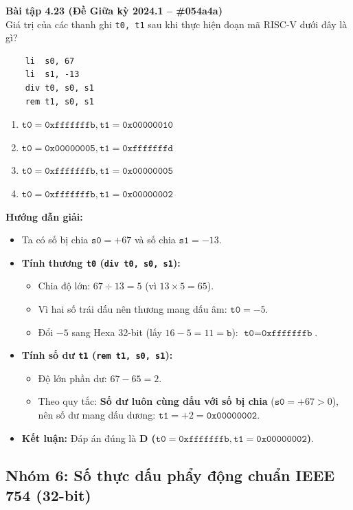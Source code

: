 \textbf{Bài tập 4.23 (Đề Giữa kỳ 2024.1 -- \#054a4a)}\\
Giá trị của các thanh ghi \texttt{t0, t1} sau khi thực hiện đoạn mã RISC-V dưới đây là gì?
\begin{lstlisting}
    li  s0, 67
    li  s1, -13
    div t0, s0, s1
    rem t1, s0, s1
\end{lstlisting}
\begin{enumerate}[label=\Alph*.]
    \item $\texttt{t0} = \texttt{0xfffffffb}, \texttt{t1} = \texttt{0x00000010}$
    \item $\texttt{t0} = \texttt{0x00000005}, \texttt{t1} = \texttt{0xfffffffd}$
    \item $\texttt{t0} = \texttt{0xfffffffb}, \texttt{t1} = \texttt{0x00000005}$
    \item $\texttt{t0} = \texttt{0xfffffffb}, \texttt{t1} = \texttt{0x00000002}$
\end{enumerate}
\textbf{Hướng dẫn giải:}
\begin{itemize}
    \item Ta có số bị chia $\texttt{s0} = +67$ và số chia $\texttt{s1} = -13$.
    \item \textbf{Tính thương \texttt{t0} (\texttt{div t0, s0, s1}):}
    \begin{itemize}
        \item Chia độ lớn: $67 \div 13 = 5$ (vì $13 \times 5 = 65$).
        \item Vì hai số trái dấu nên thương mang dấu âm: $\texttt{t0} = -5$.
        \item Đổi $-5$ sang Hexa 32-bit (lấy $16 - 5 = 11 = \texttt{b}$): $\texttt{t0} = \mathbf{\texttt{0xfffffffb}}$.
    \end{itemize}
    \item \textbf{Tính số dư \texttt{t1} (\texttt{rem t1, s0, s1}):}
    \begin{itemize}
        \item Độ lớn phần dư: $67 - 65 = 2$.
        \item Theo quy tắc: \textbf{Số dư luôn cùng dấu với số bị chia} ($\texttt{s0} = +67 > 0$), nên số dư mang dấu dương: $\texttt{t1} = +2 = \mathbf{\texttt{0x00000002}}$.
    \end{itemize}
    \item \textbf{Kết luận:} Đáp án đúng là \textbf{D ($\texttt{t0} = \texttt{0xfffffffb}, \texttt{t1} = \texttt{0x00000002}$)}.
\end{itemize}

\subsection{Nhóm 6: Số thực dấu phẩy động chuẩn IEEE 754 (32-bit)}

